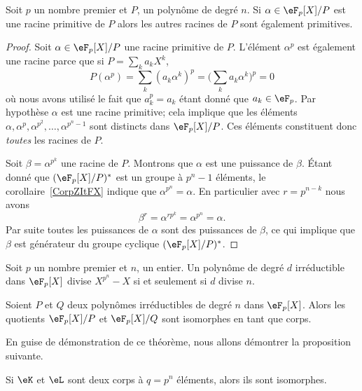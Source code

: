 \begin{lemma}       \label{Lembcerei}
    Soit \( p\) un nombre premier et \( P\), un polynôme de degré \( n\). Si \( \alpha\in \eF_p[X]/P\) est une racine primitive de \( P\) alors les autres racines de \(P\) sont également primitives.
\end{lemma}

\begin{proof}
    Soit \( \alpha\in \eF_p[X]/P\) une racine primitive de \( P\). L'élément \( \alpha^p\) est également une racine parce que si \( P=\sum_ka_kX^k\),
    \begin{equation}
        P(\alpha^p)=\sum_k(a_k\alpha^k)^p=\big( \sum_ka_k\alpha^k \big)^p=0
    \end{equation}
    où nous avons utilisé le fait que \( a_k^p=a_k\) étant donné que \( a_k\in\eF_p\). Par hypothèse \( \alpha\) est une racine primitive; cela implique que les éléments \( \alpha,\alpha^p,\alpha^{p^2},\ldots,\alpha^{p^n-1}\) sont distincts dans \( \eF_p[X]/P\). Ces éléments constituent donc \emph{toutes} les racines de \( P\).

    Soit \( \beta=\alpha^{p^k}\) une racine de \( P\). Montrons que \( \alpha\) est une puissance de \( \beta\). Étant donné que \( (\eF_p[X]/P)^*\) est un groupe à \( p^n-1\) éléments, le corollaire~\ref{CorpZItFX} indique que \( \alpha^{p^n}=\alpha\). En particulier avec \( r=p^{n-k}\) nous avons
    \begin{equation}
        \beta^r=\alpha^{rp^k}=\alpha^{p^n}=\alpha.
    \end{equation}
    Par suite toutes les puissances de \( \alpha\) sont des puissances de \( \beta\), ce qui implique que \( \beta\) est générateur du groupe cyclique \( (\eF_p[X]/P)^*\).
\end{proof}

\begin{lemma}       \label{LemkzWjse}
    Soit \( p\) un nombre premier et \( n\), un entier. Un polynôme de degré \( d\) irréductible dans \( \eF_p[X]\) divise \( X^{p^n}-X\) si et seulement si \( d\) divise \( n\).
\end{lemma}

\begin{theorem}
    Soient \( P\) et \( Q\) deux polynômes irréductibles de degré \( n\) dans \( \eF_p[X]\). Alors les quotients \( \eF_p[X]/P\) et \( \eF_p[X]/Q\) sont isomorphes en tant que corps.
\end{theorem}
En guise de démonstration de ce théorème, nous allons démontrer la proposition suivante.
\begin{proposition}      \label{PropCRPjZsp}
    Si \( \eK\) et \( \eL\) sont deux corps à \( q=p^n\) éléments, alors ils sont isomorphes.
\end{proposition}


